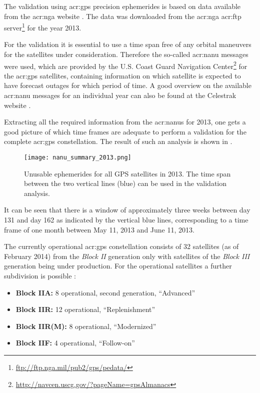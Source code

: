 The validation using \gls{acr:gps} precision ephemerides is based on data available from the \gls{acr:nga} website \cite{nga2013}. The data was downloaded from 
the \gls{acr:nga} \acrshort{acr:ftp} server\footnote{\url{ftp://ftp.nga.mil/pub2/gps/pedata/}} for the year 2013. 

For the validation it is essential to use a time span free of any orbital maneuvers for the satellites under consideration. Therefore the so-called 
\gls{acr:nanu} messages were used, which are provided by the U.S. Coast Guard Navigation Center\footnote{\url{http://navcen.uscg.gov/?pageName=gpsAlmanacs}} 
for the \gls{acr:gps} satellites, containing information on which satellite is expected to have forecast outages for which period of time. A good 
overview on the available \gls{acr:nanu} messages for an individual year can also be found at the Celestrak website \cite{celestrak-nanu-2014}.

Extracting all the required information from the \gls{acr:nanu}s for 2013, one gets a good picture of which time frames are adequate to perform a validation 
for the complete \gls{acr:gps} constellation. The result of such an analysis is shown in .
\begin{figure}[h!]
 \centering
 \texttt{[image: nanu\_summary\_2013.png]}
 \caption{Unusable ephemerides for all GPS satellites in 2013. The time span between the two vertical lines (blue) can 
be used in the validation analysis.\label{fig:val-gps-nanu-2013}}
\end{figure}
It can be seen that there is a window of approximately three weeks between day 131 and day 162 as indicated by the vertical blue lines, corresponding to a time frame of one month between May 11, 2013 and June 11, 2013.

The currently operational \gls{acr:gps} constellation consists of 32 satellites (as of February 2014) from the \textit{Block II} 
generation only \cite{gps2014} with satellites of the 
\textit{Block III} generation being under production. For the operational satellites a further subdivision is possible \cite{navcen2014}:
\begin{itemize}
 \item \textbf{Block IIA:} 8 operational, second generation, ``Advanced''
 \item \textbf{Block IIR:} 12 operational, ``Replenishment''
 \item \textbf{Block IIR(M):} 8 operational, ``Modernized''
 \item \textbf{Block IIF:} 4 operational, ``Follow-on''
\end{itemize}

